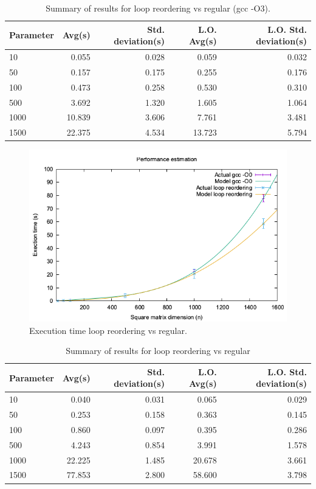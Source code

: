 \documentclass[12pt]{article}
\begin{document}
\begin{table}[h!]
	\centering
	\begin{tabular}{|l|r|r|r|r|} 
		\hline
		Parameter & Avg(s) & Std. deviation(s) & L.O. Avg(s) & L.O. Std. deviation(s) \\ [0.5ex] 
		\hline
		10 & 0.055 & 0.028 & 0.059 & 0.032 \\
		50 & 0.157 & 0.175 & 0.255 & 0.176 \\
		100 & 0.473 & 0.258 & 0.530 & 0.310 \\
		500 & 3.692 & 1.320 & 1.605 & 1.064 \\
		1000 & 10.839 & 3.606 & 7.761 & 3.481 \\
		1500 & 22.375 & 4.534 & 13.723 & 5.794 \\
		\hline
	\end{tabular}
	\caption{Summary of results for loop reordering vs regular (gcc -O3).}
	\label{tab:resultsb}
\end{table}

\newpage

\begin{figure}[h!]
	\centering
	\includegraphics[width=0.9\linewidth]{q2-loopO0.png}
	\caption{Execution time loop reordering vs regular.}
	\label{fig:exectimec}
\end{figure}


\begin{table}[h!]
	\centering
	\begin{tabular}{|l|r|r|r|r|} 
		\hline
		Parameter & Avg(s) & Std. deviation(s) & L.O. Avg(s) & L.O. Std. deviation(s) \\ [0.5ex] 
		\hline
		10 & 0.040 & 0.031 & 0.065 & 0.029 \\
		50 & 0.253 & 0.158 & 0.363 & 0.145 \\
		100 & 0.860 & 0.097 & 0.395 & 0.286 \\
		500 & 4.243 & 0.854 & 3.991 & 1.578 \\
		1000 & 22.225 & 1.485 & 20.678 & 3.661 \\
		1500 & 77.853 & 2.800 & 58.600 & 3.798 \\
		\hline
	\end{tabular}
	\caption{Summary of results for loop reordering vs regular}
	\label{tab:resultsc}
\end{table}
\end{document}
